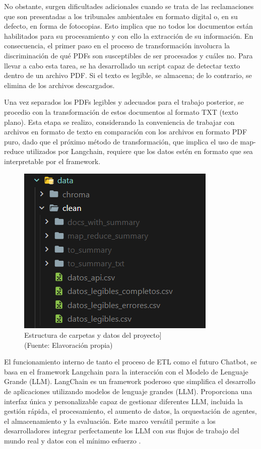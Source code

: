 \par No obstante, surgen dificultades adicionales cuando se trata de las reclamaciones que son presentadas a los tribunales ambientales 
en formato digital o, en su defecto, en forma de fotocopias. Esto implica que no todos los documentos están habilitados para su 
procesamiento y con ello la extracción de su información. En consecuencia, el primer paso en el proceso de transformación involucra la discriminación de qué PDFs son 
susceptibles de ser procesados y cuáles no. Para llevar a cabo esta tarea, se ha desarrollado un script capaz de detectar 
texto dentro de un archivo PDF. Si el texto es legible, se almacena; de lo contrario, se elimina de los archivos descargados.

\par Una vez separados los PDFs legibles y adecuados para el trabajo posterior, se procedio con la transformación de estos documentos 
al formato TXT (texto plano). Esta etapa se realizo, considerando la conveniencia de trabajar con archivos en formato de 
texto en comparación con los archivos en formato PDF puro, dado que el próximo método de transformación, que implica el uso de
map-reduce utilizados por Langchain, requiere que los datos estén en formato que sea interpretable por el framework.

 \begin{figure}[ht!]
    \centering
    \includegraphics[width=.5\textwidth]{figures/huemulFOLDERS.png}
    \caption[Estructura de carpetas y datos del proyecto]{Estructura de carpetas y datos del proyecto]\\
    {\scriptsize (Fuente: Elavoración propia)}}
    \label{fig:chatbot1}
\end{figure}

\newpage

\par El funcionamiento interno de tanto el proceso de ETL como el futuro Chatbot, se basa en el framework Langchain para la interacción con el Modelo de Lenguaje Grande (LLM). 
LangChain es un framework poderoso que simplifica el desarrollo de aplicaciones utilizando modelos de lenguaje grandes (LLM). Proporciona 
una interfaz única y personalizable capaz de gestionar diferentes LLM, incluida la gestión rápida, el procesamiento, el aumento de datos, 
la orquestación de agentes, el almacenamiento y la evaluación. Este marco versátil permite a los desarrolladores integrar perfectamente 
los LLM con sus flujos de trabajo del mundo real y datos con el mínimo esfuerzo \cite{langchain1}.

